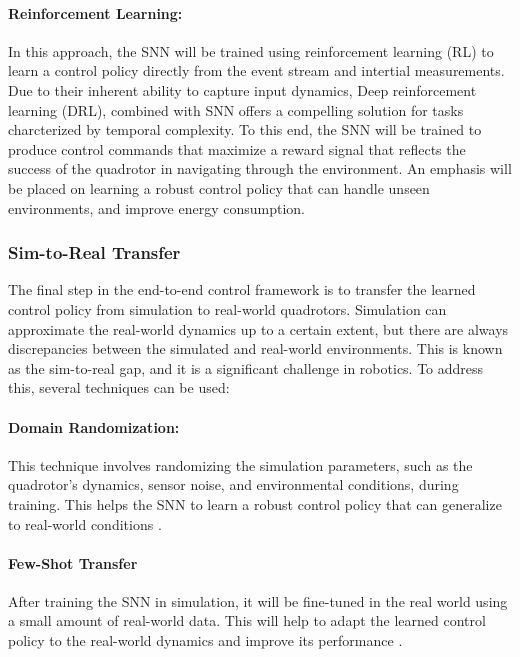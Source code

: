 \documentclass{article}
\begin{document}
\paragraph{Reinforcement Learning:} In this approach, the SNN will be trained using reinforcement learning (RL) to learn a control policy directly from the event stream and intertial measurements. Due to their inherent ability to capture input dynamics, Deep reinforcement learning (DRL), combined with SNN offers a compelling solution for tasks charcterized by temporal complexity. To this end, the SNN will be trained to produce control commands that maximize a reward signal that reflects the success of the quadrotor in navigating through the environment. An emphasis will be placed on learning a robust control policy that can handle unseen environments, and improve energy consumption. 

\subsubsection{Sim-to-Real Transfer}
The final step in the end-to-end control framework is to transfer the learned control policy from simulation to real-world quadrotors. Simulation can approximate the real-world dynamics up to a certain extent, but there are always discrepancies between the simulated and real-world environments. This is known as the sim-to-real gap, and it is a significant challenge in robotics. To address this, several techniques can be used: 
\paragraph{Domain Randomization:} This technique involves randomizing the simulation parameters, such as the quadrotor's dynamics, sensor noise, and environmental conditions, during training. This helps the SNN to learn a robust control policy that can generalize to real-world conditions \cite{loquercioDeepDroneRacing2020}.
\paragraph{Few-Shot Transfer} After training the SNN in simulation, it will be fine-tuned in the real world using a small amount of real-world data. This will help to adapt the learned control policy to the real-world dynamics and improve its performance \cite{bhattacharyaMonocularEventBasedVision2024}.
\end{document}
